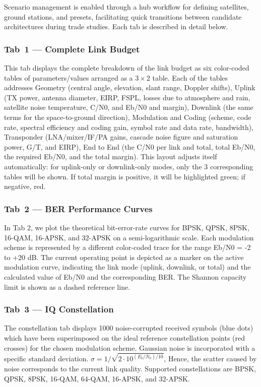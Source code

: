 \documentclass[telecom,article,submit,pdftex,moreauthors]{Definitions/mdpi}
\begin{document}
Scenario management is enabled through a hub workflow for defining satellites, ground stations, and presets, facilitating quick transitions between candidate architectures during trade studies. Each tab is described in detail below.



\subsubsection{\textbf{Tab~1 — Complete Link Budget}}
This tab displays the complete breakdown of the link budget as six color-coded tables of parameters/values
arranged as a $3\times2$ table. Each of the tables addresses Geometry (central angle, elevation, slant range,
Doppler shifts), Uplink (TX power, antenna diameter, EIRP, FSPL, losses due to atmosphere and rain,
satellite noise temperature, C/N0, and Eb/N0 and margin), Downlink (the same terms for the space-to-ground
direction), Modulation and Coding (scheme, code rate, spectral efficiency and coding gain, symbol rate and
data rate, bandwidth), Transponder (LNA/mixer/IF/PA gains, cascade noise figure and saturation power,
G/T, and EIRP), End to End (the C/N0 per link and total, total Eb/N0, the required Eb/N0, and the total
margin). This layout adjusts itself automatically: for uplink-only or downlink-only modes, only the 3
corresponding tables will be shown. If total margin is positive, it will be highlighted green; if negative, red.

\subsubsection{\textbf{Tab~2 — BER Performance Curves}}
In Tab 2, we plot the theoretical bit-error-rate curves for BPSK, QPSK, 8PSK, 16-QAM, 16-APSK, and 32-APSK on a semi-logarithmic scale. Each modulation scheme is represented by a different color-coded trace for the range Eb/N0 = -2 to +20 dB. The current operating point is depicted as a marker on the active modulation curve, indicating the link mode (uplink, downlink, or total) and the calculated value of Eb/N0 and the corresponding BER. The Shannon capacity limit is shown as a dashed reference line.



\subsubsection{\textbf{Tab~3 — IQ Constellation}}
The constellation tab displays 1000 noise-corrupted received symbols (blue dots) which have been superimposed on the ideal reference constellation points (red crosses) for the chosen modulation scheme. Gaussian noise is incorporated with a specific standard deviation. $\sigma = 1/\sqrt{2\cdot10^{(E_b/N_0)/10}}$,
Hence, the scatter caused by noise corresponds to the current link quality. Supported constellations are BPSK, QPSK, 8PSK, 16-QAM, 64-QAM, 16-APSK, and 32-APSK.
\end{document}
